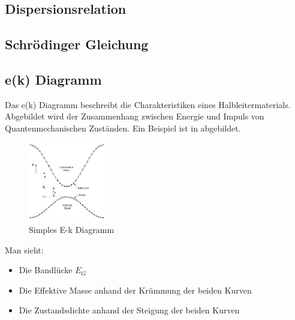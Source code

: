 \documentclass{article}
\begin{document}
\subsection{Dispersionsrelation }\label{k1:dispersionsrelation}



\subsection{Schrödinger Gleichung }\label{k1:schrGl}


\subsection{e(k) Diagramm }\label{k1:ekdiag}
Das e(k) Diagramm beschreibt die Charakteristiken eines Halbleitermaterials. Abgebildet wird der Zusammenhang
zwischen Energie und Impuls von Quantenmechanischen Zuständen.
Ein Beispiel ist in  abgebildet.
\begin{figure}[H]
    \centering
    \includegraphics[width=0.3\textwidth]{fig/ek}
    \caption{Simples E-k Diagramm}
    \label{fig:ek}
\end{figure}
Man sieht:
\begin{itemize}
    \item Die Bandlücke $E_G$
    \item Die Effektive Masse anhand der Krümmung der beiden Kurven
    \item Die Zustandsdichte anhand der Steigung der beiden Kurven
\end{itemize}
\end{document}
